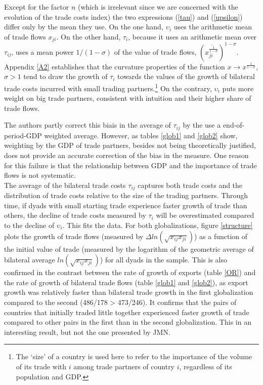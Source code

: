 \documentclass{article}
\begin{document}
Except for the factor $n$ (which is irrelevant since we are
concerned with the evolution of the trade costs index) the two
expressions (\ref{tau}) and (\ref{upsilon}) differ only by the
mean they use. On the one hand, $\upsilon_i$ uses the
arithmetic mean of trade flows $x_{ji}$. On the other hand,
$\tau_i$, because it uses an arithmetic mean over $\tau_{ij}$,
uses a mean power $1/(1-\sigma)$ of the value of trade flows,
$\left(\overline{x_{ji}^{\frac{1}{1-\sigma}}}\right)^{1-\sigma}$.
Appendix \ref{A2} establishes that the curvature
properties of the function $x \rightarrow
x^{\frac{1}{1-\sigma}}$, $\sigma>1$ tend to draw the growth of
$\tau_i$ towards the values of the growth of bilateral trade
costs incurred with small trading partners.\footnote{The `size' of a country is
used here to refer to the importance of the volume of its trade
with $i$ among trade partners of country $i$, regardless of its
population and GDP.} On the contrary,
$\upsilon_i$ puts more weight on big trade partners, consistent
with intuition and their higher share of trade flows.

The authors partly correct this biais in the average of $\tau_{ij}$ by the use a end-of-period-GDP
weighted average. However, as tables \ref{glob1} and \ref{glob2} show,
weighting by the GDP of trade partners, besides not being
theoretically justified, does not provide an accurate
correction of the bias in the measure. One reason for this
failure is that the relationship between GDP and the importance
of trade flows is not systematic.\\

The average of the bilateral trade costs $\tau_{ij}$ captures both trade
costs and the distribution of trade costs relative to the size
of the trading partners. Through time, if dyads with small starting trade experience  faster growth of trade than others, the decline of trade costs measured by $\tau_i$ will be overestimated compared to the decline of $\upsilon_i$.
This fits the data. For both globalizations, figure
\ref{structure} plots the growth of trade flows (measured by
$\Delta ln (\sqrt{x_{ij} x_{ji}})$) as a function of the
initial value of trade (measured by the logarithm of the
geometric average of bilateral average $ln(\sqrt{x_{ij}
x_{ji}})$) for all dyads in the sample. This is also confirmed in the contrast between the rate of growth of exports
(table \ref{OR}) and the rate of growth of bilateral trade flows (table \ref{glob1} and \ref{glob2}), as export growth was relatively faster than bilateral trade growth in the first globalization compared to the second (486/178 > 473/246). It confirms that the pairs of countries that initially traded little together experienced faster growth of trade compared to other pairs in the first than in the second globalization.  This in an interesting result, but not the one presented by JMN.
\end{document}
